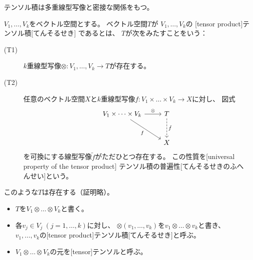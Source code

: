 \documentclass[report]{jlreq}
\begin{document}
テンソル積は多重線型写像と密接な関係をもつ。

\begin{definition}[テンソル積]
    $V_1, \dots, V_k$をベクトル空間とする。
    ベクトル空間$T$が
    $V_1, \dots, V_k$の
    [tensor product]{テンソル積}[てんそるせき]
    であるとは、
    $T$が次をみたすことをいう：
    \begin{description}
        \item[(T1)]
            $k$重線型写像$\otimes \colon V_1, \dots, V_k \to T$が存在する。
        \item[(T2)]
            任意のベクトル空間$X$と$k$重線型写像$f \colon V_1 \times \dots \times V_k \to X$に対し、
            図式
            \begin{equation}
                \begin{tikzcd}[row sep=large]
                    V_1 \times \dots \times V_k \ar{r}{\otimes}
                        \ar{dr}[swap]{f}
                        & T \ar[dashed]{d}{\tilde{f}} \\
                    & X
                \end{tikzcd}
            \end{equation}
            を可換にする線型写像$\tilde{f}$がただひとつ存在する。
            この性質を[universal property of the tensor product]
            {テンソル積の普遍性}[てんそるせきのふへんせい]という。
    \end{description}
    このような$T$は存在する（証明略）。
    \begin{itemize}
        \item $T$を$V_1 \otimes \dots \otimes V_k$と書く。
        \item 各$v_j \in V_j\; (j = 1, \dots, k)$に対し、
            $\otimes(v_1, \dots, v_k)$を$v_1 \otimes \dots \otimes v_k$と書き、
            $v_1, \dots, v_k$の[tensor product]{テンソル積}[てんそるせき]と呼ぶ。
        \item $V_1 \otimes \dots \otimes V_k$の元を[tensor]{テンソル}と呼ぶ。
    \end{itemize}
\end{definition}
\end{document}
